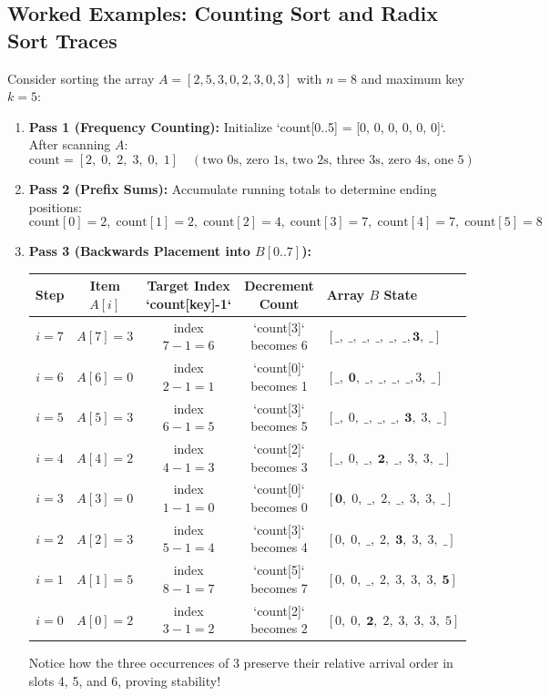 \documentclass[11pt,a4paper]{article}
\begin{document}
\subsection{Worked Examples: Counting Sort and Radix Sort Traces}

\begin{examplebox}
Consider sorting the array $A = [2, 5, 3, 0, 2, 3, 0, 3]$ with $n = 8$ and maximum key $k = 5$:
\begin{enumerate}[itemsep=2pt]
    \item \textbf{Pass 1 (Frequency Counting):} Initialize `count[0..5] = [0, 0, 0, 0, 0, 0]`. After scanning $A$:
    \[
    \text{count} = [2,\; 0,\; 2,\; 3,\; 0,\; 1] \quad (\text{two } 0\text{s, zero } 1\text{s, two } 2\text{s, three } 3\text{s, zero } 4\text{s, one } 5)
    \]
    \item \textbf{Pass 2 (Prefix Sums):} Accumulate running totals to determine ending positions:
    \[
    \text{count}[0]=2,\; \text{count}[1]=2,\; \text{count}[2]=4,\; \text{count}[3]=7,\; \text{count}[4]=7,\; \text{count}[5]=8
    \]
    \item \textbf{Pass 3 (Backwards Placement into $B[0..7]$):}
    \begin{center}
    \begin{tabular}{c c c c l}
    \toprule
    \textbf{Step} & \textbf{Item $A[i]$} & \textbf{Target Index `count[key]-1`} & \textbf{Decrement Count} & \textbf{Array $B$ State} \\
    \midrule
    $i = 7$ & $A[7] = 3$ & index $7 - 1 = 6$ & `count[3]` becomes 6 & $[\_,\; \_,\; \_,\; \_,\; \_,\; \_, \mathbf{3},\; \_]$ \\
    $i = 6$ & $A[6] = 0$ & index $2 - 1 = 1$ & `count[0]` becomes 1 & $[\_,\; \mathbf{0},\; \_,\; \_,\; \_,\; \_, 3,\; \_]$ \\
    $i = 5$ & $A[5] = 3$ & index $6 - 1 = 5$ & `count[3]` becomes 5 & $[\_,\; 0,\; \_,\; \_,\; \_,\; \mathbf{3},\; 3,\; \_]$ \\
    $i = 4$ & $A[4] = 2$ & index $4 - 1 = 3$ & `count[2]` becomes 3 & $[\_,\; 0,\; \_,\; \mathbf{2},\; \_,\; 3,\; 3,\; \_]$ \\
    $i = 3$ & $A[3] = 0$ & index $1 - 1 = 0$ & `count[0]` becomes 0 & $[\mathbf{0},\; 0,\; \_,\; 2,\; \_,\; 3,\; 3,\; \_]$ \\
    $i = 2$ & $A[2] = 3$ & index $5 - 1 = 4$ & `count[3]` becomes 4 & $[0,\; 0,\; \_,\; 2,\; \mathbf{3},\; 3,\; 3,\; \_]$ \\
    $i = 1$ & $A[1] = 5$ & index $8 - 1 = 7$ & `count[5]` becomes 7 & $[0,\; 0,\; \_,\; 2,\; 3,\; 3,\; 3,\; \mathbf{5}]$ \\
    $i = 0$ & $A[0] = 2$ & index $3 - 1 = 2$ & `count[2]` becomes 2 & $[0,\; 0,\; \mathbf{2},\; 2,\; 3,\; 3,\; 3,\; 5]$ \\
    \bottomrule
    \end{tabular}
    \end{center}
    Notice how the three occurrences of $3$ preserve their relative arrival order in slots 4, 5, and 6, proving stability!
\end{enumerate}
\end{examplebox}
\end{document}
